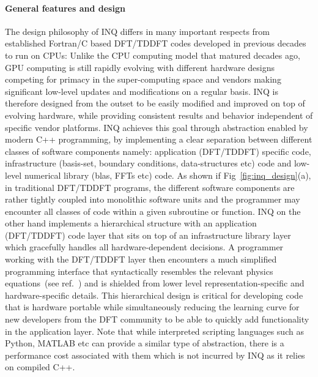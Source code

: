 \paragraph{General features and design}
The design philosophy of INQ differs in many important respects from established Fortran/C based DFT/TDDFT codes developed in previous decades to run on CPUs: Unlike the CPU computing model that matured decades ago, GPU computing is still rapidly evolving with different hardware designs  competing for primacy in the super-computing space and vendors making significant low-level updates and modifications on a regular basis. \textsc{INQ} is therefore designed from the outset to be easily modified and improved on top of evolving hardware, while providing consistent results and behavior independent of specific vendor platforms. \textsc{INQ} achieves this goal through abstraction enabled by modern C++ programming, by implementing a clear separation between different classes of software components namely: application (DFT/TDDFT) specific code, infrastructure (basis-set, boundary conditions, data-structures etc) code and low-level numerical library (blas, FFTs etc) code. 
\newline 
\newline
As shown if Fig~\ref{fig:inq_design}(a), in traditional DFT/TDDFT programs, the different software components are rather tightly coupled into monolithic software units and the programmer may encounter all classes of code within a given subroutine or function. \textsc{INQ} on the other hand implements a hierarchical structure with an application (DFT/TDDFT) code layer that sits on top of an infrastructure library layer which gracefully handles all hardware-dependent decisions. A programmer working with the DFT/TDDFT layer then encounters a much simplified programming interface that  syntactically resembles the relevant physics equations~(see ref.~\cite{Andrade2021}) and is shielded from lower level representation-specific and hardware-specific details. This hierarchical design is critical for developing code that is hardware portable while simultaneously reducing the learning curve for new developers from the DFT community to be able to quickly add functionality in the application layer. Note that while interpreted scripting languages such as Python, MATLAB etc can provide a similar type of abstraction, there is a performance cost associated with them which is not incurred by \textsc{INQ} as it relies on compiled C++.   
